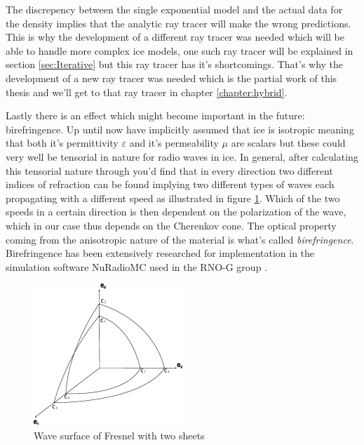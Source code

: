 \documentclass[11pt,a4paper,faculty=we,language=en,doctype=report]{cls/ugent-doc}
\begin{document}
The discrepency between the single exponential model and the actual data for
the density implies that the analytic ray tracer will make the wrong
predictions.  This is why the development of a different ray tracer was needed
which will be able to handle more complex ice models, one such ray tracer will
be explained in section \ref{sec:Iterative} but this ray tracer has it's
shortcomings. That's why the development of a new ray tracer was needed which
is the partial work of this thesis and we'll get to that ray tracer in chapter
\ref{chapter:hybrid}.

Lastly there is an effect which might become important in the future:
birefringence.  Up until now have implicitly assumed that ice is isotropic
meaning that both it's permittivity $\varepsilon$ and it's permeability $\mu$
are scalars but these could very well be tensorial in nature for radio waves in
ice. In general, after calculating this tensorial nature through you'd find
that in every direction two different indices of refraction can be found
implying two different types of waves each propagating with a different speed
as illustrated in figure \ref{fig:Fresnel}. Which of the two speeds in a
certain direction is then dependent on the polarization of the wave, which in
our case thus depends on the Cherenkov cone. The optical property coming from
the anisotropic nature of the material is what's called \textit{birefringence}.
Birefringence has been extensively researched for implementation in the
simulation software NuRadioMC used in the RNO-G group \cite{Heyer2023}.
\begin{figure}
  \centering
  \includegraphics[width=0.5\textwidth]{figures/Fresnel.pdf}
  \caption{Wave surface of Fresnel with two sheets}
  \label{fig:Fresnel}
\end{figure}
\end{document}
